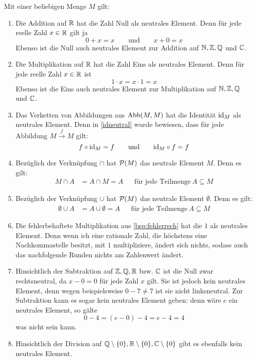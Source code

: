 \begin{bsp} \label{bsp:neutrales}
    Mit einer beliebigen Menge $M$ gilt:
    \begin{enumerate}
        \item Die Addition auf $\mathbb R$ hat die Zahl Null als neutrales Element. Denn für jede reelle Zahl $x\in \mathbb R$ gilt ja
            \[ 0+x=x \qquad\text{und}\qquad x+0=x \]
        Ebenso ist die Null auch neutrales Element zur Addition auf $\mathbb N,\mathbb Z,\mathbb Q$ und $\mathbb C$.
        \item Die Multiplikation auf $\mathbb R$ hat die Zahl Eins als neutrales Element. Denn für jede reelle Zahl $x\in \mathbb R$ ist
            \[ 1\cdot x = x\cdot 1= x \]
        Ebenso ist die Eins auch neutrales Element zur Multiplikation auf $\mathbb N,\mathbb Z,\mathbb Q$ und $\mathbb C$.
        \item Das Verketten von Abbildungen aus $\operatorname{Abb}(M,M)$ hat die Identität $\mathrm{id}_M$ als neutrales Element. Denn in \cref{idneutral} wurde bewiesen, dass für jede Abbildung $M\xrightarrow{f} M$ gilt:
            \[ f\circ \mathrm{id}_M = f \qquad\text{und}\qquad \mathrm{id}_M \circ f = f \]
        \item Bezüglich der Verknüpfung $\cap$ hat $\mathcal P(M)$ das neutrale Element $M$. Denn es gilt:
        \begin{align*}
            M\cap A & = A\cap M = A && \text{für jede Teilmenge}\ A\subseteq M
        \end{align*}
        \item Bezüglich der Verknüpfung $\cup$ hat $\mathcal P(M)$ das neutrale Element $\emptyset$. Denn es gilt:
        \begin{align*}
            \emptyset\cup A & = A\cup \emptyset = A && \text{für jede Teilmenge}\ A\subseteq M
        \end{align*}
        \item Die fehlerbehaftete Multiplikation aus \cref{bsp:fehlerrech} hat die $1$ als neutrales Element. Denn wenn ich eine rationale Zahl, die höchstens eine Nachkommastelle besitzt, mit $1$ multipliziere, ändert sich nichts, sodass auch das nachfolgende Runden nichts am Zahlenwert ändert.
        \item Hinsichtlich der Subtraktion auf $\mathbb Z,\mathbb Q,\mathbb R$ bzw. $\mathbb C$ ist die Null zwar rechtsneutral, da $x-0=0$ für jede Zahl $x$ gilt. Sie ist jedoch kein neutrales Element, denn wegen beispielsweise $0-7\neq 7$ ist sie nicht linksneutral. Zur Subtraktion kann es sogar kein neutrales Element geben: denn wäre $e$ ein neutrales Element, so gälte
            \[ 0-4 = (e-0)-4 = e-4 = 4 \]
        was nicht sein kann.
        \item Hinsichtlich der Division auf $\mathbb Q\setminus \{0\},\mathbb R\setminus \{0\},\mathbb C\setminus \{0\}$ gibt es ebenfalls kein neutrales Element.
    \end{enumerate}
\end{bsp}


